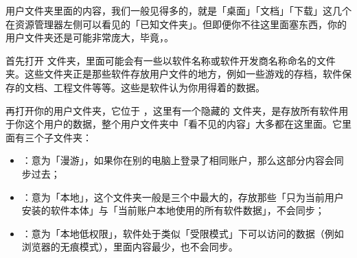 用户文件夹里面的内容，我们一般见得多的，就是「桌面」「文档」「下载」这几个在资源管理器左侧可以看见的「已知文件夹」。但即便你不往这里面塞东西，你的用户文件夹还是可能非常庞大，毕竟，。

首先打开  文件夹，里面可能会有一些以软件名称或软件开发商名称命名的文件夹。这些文件夹正是那些软件存放用户文件的地方，例如一些游戏的存档，软件保存的文档、工程文件等等。这些是软件认为你用得着的数据。

再打开你的用户文件夹，它位于 ，这里有一个隐藏的  文件夹，是存放所有软件用于你这个用户的数据，整个用户文件夹中「看不见的内容」大多都在这里面。它里面有三个子文件夹：
\begin{itemize}
  \item {}：意为「漫游」，如果你在别的电脑上登录了相同账户，那么这部分内容会同步过去；
  \item {}：意为「本地」，这个文件夹一般是三个中最大的，存放那些「只为当前用户安装的软件本体」与「当前账户本地使用的所有软件数据」，不会同步；
  \item {}：意为「本地低权限」，软件处于类似「受限模式」下可以访问的数据（例如浏览器的无痕模式），里面内容最少，也不会同步。
\end{itemize}

